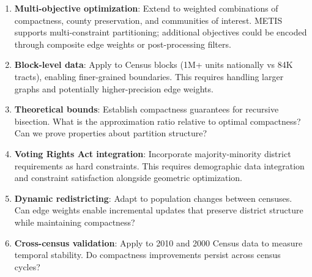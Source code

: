 \begin{enumerate}
    \item \textbf{Multi-objective optimization}: Extend to weighted combinations of compactness, county preservation, and communities of interest. METIS supports multi-constraint partitioning; additional objectives could be encoded through composite edge weights or post-processing filters.

    \item \textbf{Block-level data}: Apply to Census blocks (1M+ units nationally vs 84K tracts), enabling finer-grained boundaries. This requires handling larger graphs and potentially higher-precision edge weights.

    \item \textbf{Theoretical bounds}: Establish compactness guarantees for recursive bisection. What is the approximation ratio relative to optimal compactness? Can we prove properties about partition structure?

    \item \textbf{Voting Rights Act integration}: Incorporate majority-minority district requirements as hard constraints. This requires demographic data integration and constraint satisfaction alongside geometric optimization.

    \item \textbf{Dynamic redistricting}: Adapt to population changes between censuses. Can edge weights enable incremental updates that preserve district structure while maintaining compactness?

    \item \textbf{Cross-census validation}: Apply to 2010 and 2000 Census data to measure temporal stability. Do compactness improvements persist across census cycles?
\end{enumerate}
